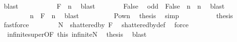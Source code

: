 \begin{isabellebody}
\ blast\isanewline
\ \ \ \ \ \ \isamarkupfalse%
\ {}{\isacharcolon}{\kern0pt}\ {\isachardoublequoteopen}{\isacharbraceleft}{\kern0pt}{\isacharbraceright}{\kern0pt}\ {\isasymin}\ {\isacharquery}{\kern0pt}F\ {\isasyminter}{\isacharasterisk}{\kern0pt}\ {\isacharbraceleft}{\kern0pt}n{\isacharbraceright}{\kern0pt}{\isachardoublequoteclose}\ \isamarkupfalse%
\ blast\isanewline
\ \ \ \ \ \ \isamarkupfalse%
\ False\ \isamarkupfalse%
\ {\isachardoublequoteopen}{\isacharparenleft}{\kern0pt}odd\ {\isacharminus}{\kern0pt}{\isacharbackquote}{\kern0pt}\ {\isacharbraceleft}{\kern0pt}False{\isacharbraceright}{\kern0pt}{\isacharparenright}{\kern0pt}\ {\isasyminter}\ {\isacharbraceleft}{\kern0pt}n{\isacharbraceright}{\kern0pt}\ {\isacharequal}{\kern0pt}\ {\isacharbraceleft}{\kern0pt}n{\isacharbraceright}{\kern0pt}{\isachardoublequoteclose}\ \isamarkupfalse%
\ blast\isanewline
\ \ \ \ \ \ \isamarkupfalse%
\ {}{\isacharcolon}{\kern0pt}\ {\isachardoublequoteopen}{\isacharbraceleft}{\kern0pt}n{\isacharbraceright}{\kern0pt}\ {\isasymin}\ {\isacharquery}{\kern0pt}F\ {\isasyminter}{\isacharasterisk}{\kern0pt}\ {\isacharbraceleft}{\kern0pt}n{\isacharbraceright}{\kern0pt}{\isachardoublequoteclose}\ \isamarkupfalse%
\ blast\isanewline
\ \ \ \ \ \ \isamarkupfalse%
\ {}\ {}\ Pow{\isacharunderscore}{\kern0pt}n\ \isamarkupfalse%
\ {\isacharquery}{\kern0pt}thesis\ \isamarkupfalse%
\ simp\isanewline
\ \ \ \ \isamarkupfalse%
\isanewline
\ \ \ \ \isamarkupfalse%
\ {\isacharquery}{\kern0pt}thesis\ \isamarkupfalse%
\ fastforce\isanewline
\ \ \isamarkupfalse%
\isanewline
\ \ \isamarkupfalse%
\ \isamarkupfalse%
\ {\isachardoublequoteopen}{\isacharquery}{\kern0pt}N\ {\isasymsubseteq}\ shattered{\isacharunderscore}{\kern0pt}by\ {\isacharquery}{\kern0pt}F{\isachardoublequoteclose}\ \isamarkupfalse%
\ shattered{\isacharunderscore}{\kern0pt}by{\isacharunderscore}{\kern0pt}def\ \isamarkupfalse%
\ force\isanewline
\ \ \isamarkupfalse%
\ {}\ infinite{\isacharunderscore}{\kern0pt}super{\isacharbrackleft}{\kern0pt}OF\ this\ infinite{\isacharunderscore}{\kern0pt}N{\isacharbrackright}{\kern0pt}\ \isamarkupfalse%
\ {\isacharquery}{\kern0pt}thesis\ \isamarkupfalse%
\ blast\isanewline
{}\isamarkupfalse%
%
\endisatagproof
{\isafoldproof}%
%
\isadelimproof
\isanewline
%
\endisadelimproof
\isanewline
%
\isadelimtheory
\isanewline
%
\endisadelimtheory
%
\isatagtheory
{}\isamarkupfalse%
%
\endisatagtheory
{\isafoldtheory}%
%
\isadelimtheory
%
\endisadelimtheory
%
\end{isabellebody}%
